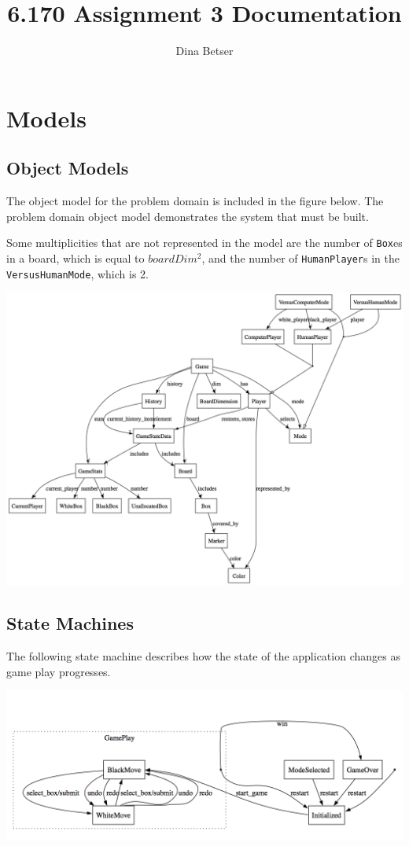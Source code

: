 \documentclass[11pt,letterpaper]{article}
\title{6.170 Assignment 3 Documentation}
\author{Dina Betser}
\begin{document}
\maketitle

\section{Models}
\subsection{Object Models}
The object model for the problem domain is included in the figure below. The problem domain object model demonstrates the system that must be built. 

Some multiplicities that are not represented in the model are the number of \texttt{Box}es in a board, which is equal to $boardDim^2$, and the number of \texttt{HumanPlayer}s in the \texttt{VersusHumanMode}, which is 2.
\begin{center}
\includegraphics[width=9.5in, angle=90]{dot/obmod.png}
\label{fig:ob1} 
\end{center}

\subsection{State Machines}
The following state machine describes how the state of the application changes as game play progresses.
\begin{center}
\includegraphics[width=7in]{dot/statediag.png}
\label{fig:sm1} 
\end{center}
\end{document}
